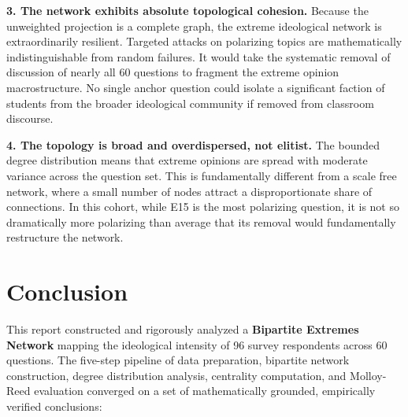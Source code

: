 \documentclass[11pt, a4paper]{article}
\begin{document}
\textbf{3. The network exhibits absolute topological cohesion.} Because the unweighted projection is a complete graph, the extreme ideological network is extraordinarily resilient. Targeted attacks on polarizing topics are mathematically indistinguishable from random failures. It would take the systematic removal of discussion of nearly all 60 questions to fragment the extreme opinion macrostructure. No single anchor question could isolate a significant faction of students from the broader ideological community if removed from classroom discourse.

\textbf{4. The topology is broad and overdispersed, not elitist.} The bounded degree distribution means that extreme opinions are spread with moderate variance across the question set. This is fundamentally different from a scale free network, where a small number of nodes attract a disproportionate share of connections. In this cohort, while E15 is the most polarizing question, it is not so dramatically more polarizing than average that its removal would fundamentally restructure the network.

\section{Conclusion}

This report constructed and rigorously analyzed a \textbf{Bipartite Extremes Network} mapping the ideological intensity of 96 survey respondents across 60 questions. The five-step pipeline of data preparation, bipartite network construction, degree distribution analysis, centrality computation, and Molloy-Reed evaluation converged on a set of mathematically grounded, empirically verified conclusions:
\end{document}

